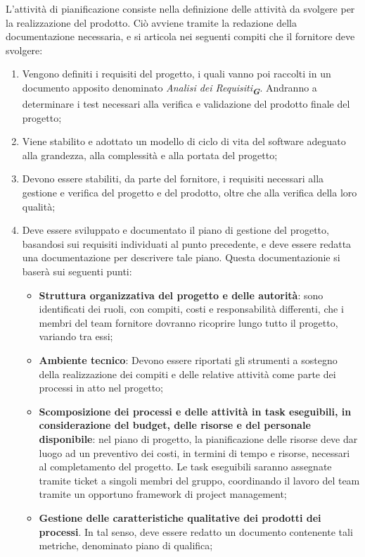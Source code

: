 L'attività di pianificazione consiste nella definizione delle attività da svolgere per la realizzazione del prodotto. Ciò avviene tramite la redazione della documentazione necessaria, e si articola nei seguenti compiti che il fornitore deve svolgere:
\begin{enumerate}
    \item Vengono definiti i requisiti del progetto, i quali vanno poi raccolti in un documento apposito denominato \emph{Analisi dei Requisiti}\textsubscript{\textit{\textbf{G}}}. Andranno a determinare i test necessari alla verifica e validazione del prodotto finale del progetto;
    \item Viene stabilito e adottato un modello di ciclo di vita del software adeguato alla grandezza, alla complessità e alla portata del progetto;
    \item Devono essere stabiliti, da parte del fornitore, i requisiti necessari alla gestione e verifica del progetto e del prodotto, oltre che alla verifica della loro qualità;
    \item Deve essere sviluppato e documentato il piano di gestione del progetto, basandosi sui requisiti individuati al punto precedente, e deve essere redatta una documentazione per descrivere tale piano. Questa documentazionie si baserà sui seguenti punti:
    \begin{itemize}
        \item \textbf{Struttura organizzativa del progetto e delle autorità}: sono identificati dei ruoli, con compiti, costi e responsabilità differenti, che i membri del team fornitore dovranno ricoprire lungo tutto il progetto, variando tra essi;
        \item \textbf{Ambiente tecnico}: Devono essere riportati gli strumenti a sostegno della realizzazione dei compiti e delle relative attività come parte dei processi in atto nel progetto;
        \item \textbf{Scomposizione dei processi e delle attività in task eseguibili, in considerazione del budget, delle risorse e del personale disponibile}: nel piano di progetto, la pianificazione delle risorse deve dar luogo ad un preventivo dei costi, in termini di tempo e risorse, necessari al completamento del progetto. Le task eseguibili saranno assegnate tramite ticket a singoli membri del gruppo, coordinando il lavoro del team tramite un opportuno framework di project management;
        \item \textbf{Gestione delle caratteristiche qualitative dei prodotti dei processi}. In tal senso, deve essere redatto un documento contenente tali metriche, denominato piano di qualifica;

\end{itemize}
\end{enumerate}
